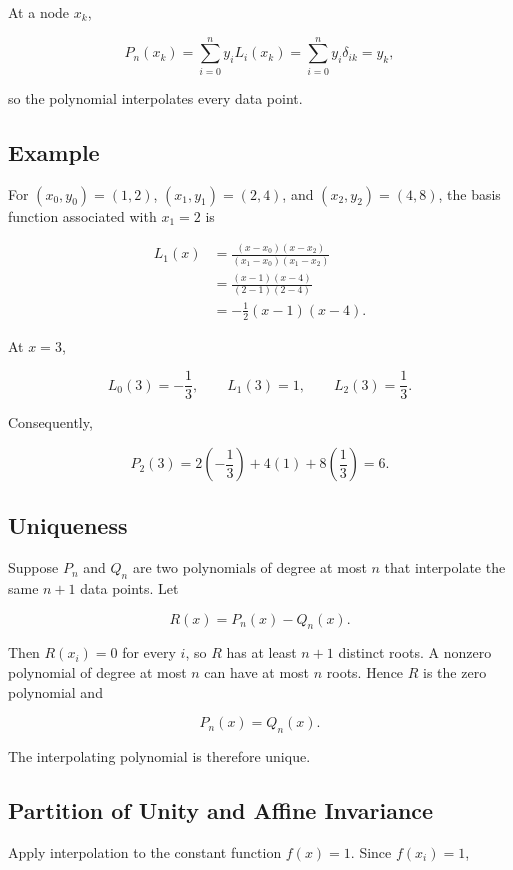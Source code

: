 \documentclass[12pt, a4paper]{article}
\theoremstyle{break}
\begin{document}
At a node \(x_k\),

\[
P_n(x_k)=\sum_{i=0}^n y_iL_i(x_k)
=\sum_{i=0}^n y_i\delta_{ik}=y_k,
\]

so the polynomial interpolates every data point.

\subsection{Example}\label{example}

For \((x_0,y_0)=(1,2)\), \((x_1,y_1)=(2,4)\), and \((x_2,y_2)=(4,8)\), the basis function associated with \(x_1=2\) is

\[
\begin{aligned}
L_1(x)&=\frac{(x-x_0)(x-x_2)}{(x_1-x_0)(x_1-x_2)}\\
&=\frac{(x-1)(x-4)}{(2-1)(2-4)}\\
&=-\frac12(x-1)(x-4).
\end{aligned}
\]

At \(x=3\),

\[
L_0(3)=-\frac13,\qquad L_1(3)=1,\qquad L_2(3)=\frac13.
\]

Consequently,

\[
P_2(3)=2\left(-\frac13\right)+4(1)+8\left(\frac13\right)=6.
\]

\subsection{Uniqueness}\label{uniqueness}

Suppose \(P_n\) and \(Q_n\) are two polynomials of degree at most \(n\) that interpolate the same \(n+1\) data points. Let

\[
R(x)=P_n(x)-Q_n(x).
\]

Then \(R(x_i)=0\) for every \(i\), so \(R\) has at least \(n+1\) distinct roots. A nonzero polynomial of degree at most \(n\) can have at most \(n\) roots. Hence \(R\) is the zero polynomial and

\[
P_n(x)=Q_n(x).
\]

The interpolating polynomial is therefore unique.

\subsection{Partition of Unity and Affine Invariance}\label{partition-of-unity-and-affine-invariance}

Apply interpolation to the constant function \(f(x)=1\). Since \(f(x_i)=1\),
\end{document}
